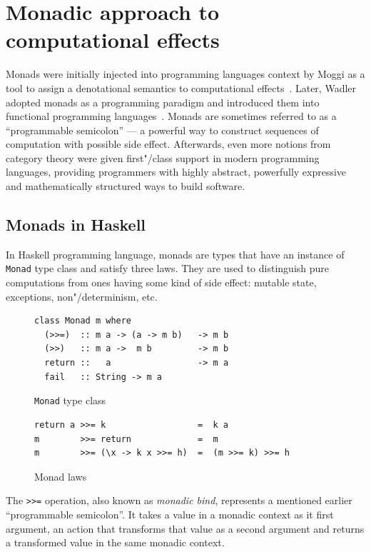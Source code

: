 \chapter{Monadic approach to computational effects}
\label{cpt-monads}

  Monads were initially injected into programming languages context by Moggi as a tool to
  assign a denotational semantics to computational effects~\cite{Moggi:1991:NCM:116981.116984}. Later, Wadler adopted monads as a programming
  paradigm and introduced them into functional programming languages~\cite{Wadler:1992:EFP:143165.143169}. Monads are sometimes referred to as a ``programmable semicolon'' --- a powerful way to construct sequences of computation with possible side effect. Afterwards, even more notions from category theory were given first"/class support in modern programming languages, providing programmers with highly abstract, powerfully expressive and mathematically structured ways to build software.

    \section{Monads in Haskell}

    In Haskell programming language, monads are types that have an instance of \texttt{Monad} type class and satisfy three laws. They are used
    to distinguish pure computations from ones having some kind of side effect:
    mutable state, exceptions, non"/determinism, etc.

    \begin{figure}[h]
    \begin{lstlisting}
class Monad m where
  (>>=)  :: m a -> (a -> m b)   -> m b
  (>>)   :: m a ->  m b         -> m b
  return ::   a                 -> m a
  fail   :: String -> m a
    \end{lstlisting}
    \caption{\texttt{Monad} type class}
    \label{listing:monadClass}
    \end{figure}

    \begin{figure}[h]
    \begin{lstlisting}
return a >>= k                  =  k a
m        >>= return             =  m
m        >>= (\x -> k x >>= h)  =  (m >>= k) >>= h
    \end{lstlisting}
    \caption{Monad laws}
    \label{listing:monadLaws}
    \end{figure}

    The \lstinline{>>=} operation, also known as \emph{monadic bind}, represents
    a mentioned earlier ``programmable semicolon''. It takes a value in a monadic context as it first argument, an action that transforms that value as a second argument and returns a transformed value in the same monadic context.

